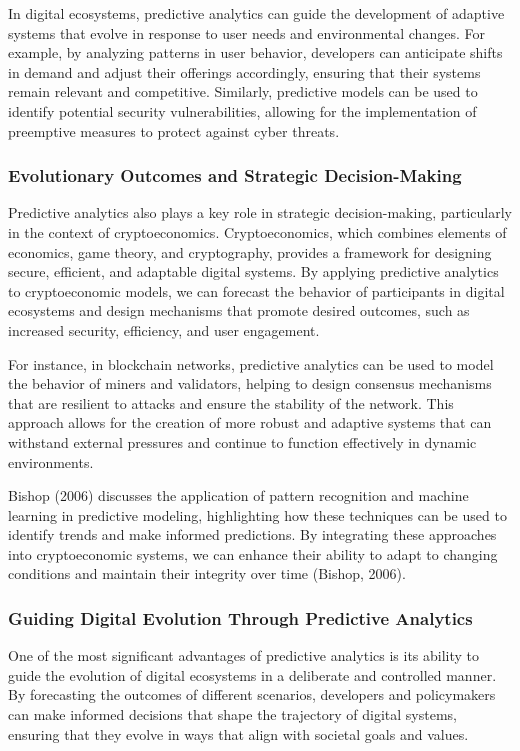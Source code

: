 \documentclass[12pt,twoside]{article}
\begin{document}
In digital ecosystems, predictive analytics can guide the development of adaptive systems that evolve in response to user needs and environmental changes. For example, by analyzing patterns in user behavior, developers can anticipate shifts in demand and adjust their offerings accordingly, ensuring that their systems remain relevant and competitive. Similarly, predictive models can be used to identify potential security vulnerabilities, allowing for the implementation of preemptive measures to protect against cyber threats.


\subsubsection{Evolutionary Outcomes and Strategic Decision-Making}

Predictive analytics also plays a key role in strategic decision-making, particularly in the context of cryptoeconomics. Cryptoeconomics, which combines elements of economics, game theory, and cryptography, provides a framework for designing secure, efficient, and adaptable digital systems. By applying predictive analytics to cryptoeconomic models, we can forecast the behavior of participants in digital ecosystems and design mechanisms that promote desired outcomes, such as increased security, efficiency, and user engagement.

For instance, in blockchain networks, predictive analytics can be used to model the behavior of miners and validators, helping to design consensus mechanisms that are resilient to attacks and ensure the stability of the network. This approach allows for the creation of more robust and adaptive systems that can withstand external pressures and continue to function effectively in dynamic environments.

Bishop (2006) discusses the application of pattern recognition and machine learning in predictive modeling, highlighting how these techniques can be used to identify trends and make informed predictions. By integrating these approaches into cryptoeconomic systems, we can enhance their ability to adapt to changing conditions and maintain their integrity over time (Bishop, 2006).


\subsubsection{Guiding Digital Evolution Through Predictive Analytics}

One of the most significant advantages of predictive analytics is its ability to guide the evolution of digital ecosystems in a deliberate and controlled manner. By forecasting the outcomes of different scenarios, developers and policymakers can make informed decisions that shape the trajectory of digital systems, ensuring that they evolve in ways that align with societal goals and values.
\end{document}

